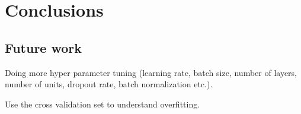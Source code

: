 \chapter{Conclusions}

\section{Future work}

Doing more hyper parameter tuning (learning rate, batch size, number of layers, number of units, dropout rate, batch normalization etc.).

Use the cross validation set to understand overfitting.